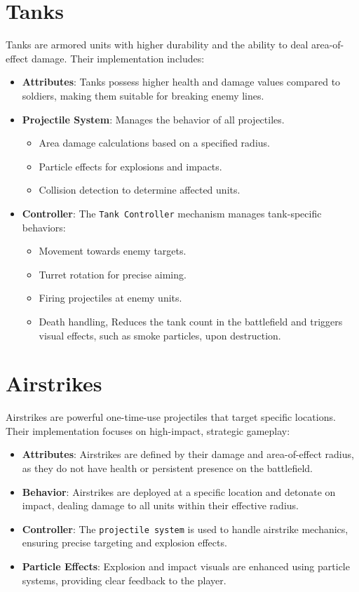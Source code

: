 \section{Tanks}
Tanks are armored units with higher durability and the ability to deal area-of-effect damage. Their implementation includes:
\begin{itemize}
    \item \textbf{Attributes}: Tanks possess higher health and damage values compared to soldiers, making them suitable for breaking enemy lines.
    \item \textbf{Projectile System}: Manages the behavior of all projectiles.
    \begin{itemize}
        \item Area damage calculations based on a specified radius.
        \item Particle effects for explosions and impacts.
        \item Collision detection to determine affected units.
    \end{itemize}
    \item \textbf{Controller}: The \texttt{Tank Controller} mechanism manages tank-specific behaviors:
    \begin{itemize}
        \item Movement towards enemy targets.
        \item Turret rotation for precise aiming.
        \item Firing projectiles at enemy units.
        \item Death handling, Reduces the tank count in the battlefield and triggers visual effects, such as smoke particles, upon destruction.
    \end{itemize}
\end{itemize}

\section{Airstrikes}
Airstrikes are powerful one-time-use projectiles that target specific locations. Their implementation focuses on high-impact, strategic gameplay:
\begin{itemize}
    \item \textbf{Attributes}: Airstrikes are defined by their damage and area-of-effect radius, as they do not have health or persistent presence on the battlefield.
    \item \textbf{Behavior}: Airstrikes are deployed at a specific location and detonate on impact, dealing damage to all units within their effective radius.
    \item \textbf{Controller}: The \texttt{projectile system} is used to handle airstrike mechanics, ensuring precise targeting and explosion effects.
    \item \textbf{Particle Effects}: Explosion and impact visuals are enhanced using particle systems, providing clear feedback to the player.
\end{itemize}

